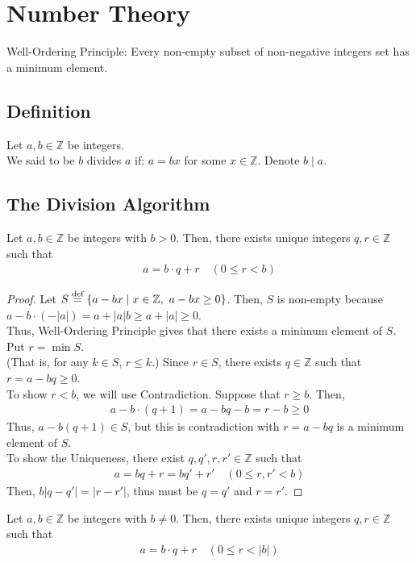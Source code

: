 \chapter{Number Theory}
Well-Ordering Principle: Every non-empty subset of non-negative integers set has a minimum element.
\section{Definition}
\begin{definition}
    Let $a, b \in \mathbb{Z}$ be integers. \\
    We said to be $b$ divides $a$ if: $a = bx$ for some $x \in \mathbb{Z}$. Denote $b \mid a$.
\end{definition}

\section{The Division Algorithm}
\begin{theorem}
    Let $a, b \in \mathbb{Z}$ be integers with $b > 0$. 
    Then, there exists unique integers $q, r \in \mathbb{Z}$ such that
    \begin{align*}
        a = b \cdot q + r \quad (0 \leq r < b)
    \end{align*}
\end{theorem}
\begin{proof}
    Let $S \overset{\textnormal{def}}{=} \{a - bx \mid x \in \mathbb{Z},\ a - bx \geq 0\}$.
    Then, $S$ is non-empty because $a - b \cdot (-|a|) = a + |a| b \geq a + |a| \geq 0$. \\
    Thus, Well-Ordering Principle gives that there exists a minimum element of $S$. Put $r = \min S$. \\
    (That is, for any $k \in S$, $r \leq k$.)
    Since $r \in S$, there exists $q \in \mathbb{Z}$ such that $ r = a - bq \geq 0$. \\
    To show $r < b$, we will use Contradiction. Suppose that $r \geq b$. Then,
    \begin{align*}
        a - b \cdot (q + 1) = a - bq - b = r - b \geq 0
    \end{align*}
    Thus, $a - b (q + 1) \in S$, but this is contradiction with $r = a - bq$ is a minimum element of $S$. \\
    To show the Uniqueness, there exist $q, q', r, r' \in \mathbb{Z}$ such that
    \begin{align*}
        a = bq + r = bq' + r' \quad(0 \leq r, r' < b)
    \end{align*}
    Then, $b|q - q'| = |r - r'|$, thus must be $q = q'$ and $r = r'$.
\end{proof}
\begin{corollary}
    Let $a, b \in \mathbb{Z}$ be integers with $b \neq 0$. 
    Then, there exists unique integers $q, r \in \mathbb{Z}$ such that
    \begin{align*}
        a = b \cdot q + r \quad (0 \leq r < |b|)
    \end{align*}
\end{corollary}

